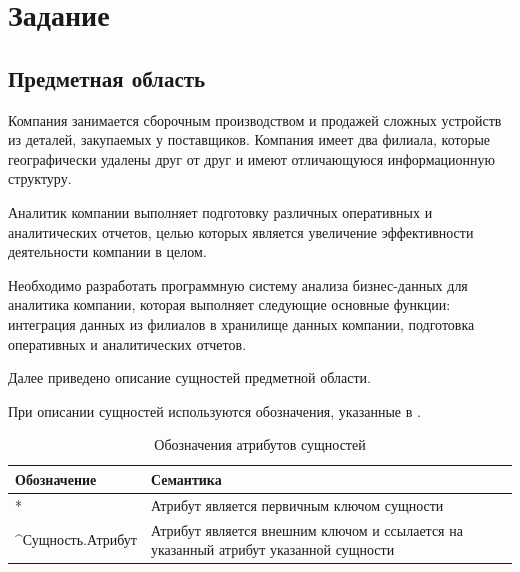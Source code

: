 




\tableofcontents		%
\thispagestyle{fancy}

\section{Задание}
\subsection{Предметная область}
Компания занимается сборочным  производством и  продажей сложных устройств из деталей, закупаемых у поставщиков. Компания имеет два филиала, которые географически удалены друг от друг и имеют отличающуюся информационную структуру.\par
Аналитик компании выполняет подготовку  различных  оперативных  и аналитических  отчетов, целью которых  является увеличение эффективности деятельности компании в целом.\par
Необходимо  разработать программную систему анализа бизнес-данных для аналитика компании, которая выполняет следующие основные функции: интеграция  данных  из  филиалов  в  хранилище данных  компании, подготовка оперативных и аналитических отчетов.\par
Далее приведено описание сущностей предметной области. \par
При описании сущностей используются обозначения, указанные в .
\begin{table}[h]
	\caption{\space Обозначения атрибутов сущностей}
	\label{semantic}
	\begin{tabular}{|p{5cm}|p{10cm}|}
		\hline
		\textbf{Обозначение} & \textbf{Семантика}\\
		\hline
		* & Атрибут является первичным ключом сущности\\
		\hline
		\textasciicircum Сущность.Атрибут & Атрибут является внешним ключом и ссылается на указанный атрибут указанной сущности\\
		\hline
	\end{tabular}
\end{table}

